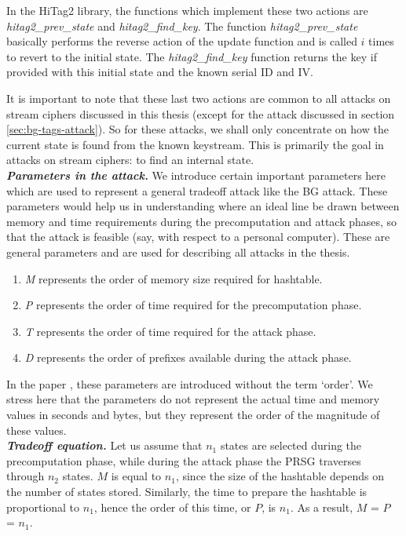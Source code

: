 In the HiTag2 library, the functions which implement these two actions are \textit{hitag2\_prev\_state} and \textit{hitag2\_find\_key}. The function \textit{hitag2\_prev\_state} basically performs the reverse action of the update function and is called $i$ times to revert to the initial state. The \textit{hitag2\_find\_key} function returns the key if provided with this initial state and the known serial ID and IV.

It is important to note that these last two actions are common to all attacks on stream ciphers discussed in this thesis (except for the attack discussed in section \ref{sec:bg-tags-attack}). So for these attacks, we shall only concentrate on how the current state is found from the known keystream. This is primarily the goal in attacks on stream ciphers: to find an internal state.\\

\noindent \textit{\textbf{Parameters in the attack.}} We introduce certain important parameters here \cite{biryukov2000ctm} which are used to represent a general tradeoff attack like the BG attack. These parameters would help us in understanding where an ideal line be drawn between memory and time requirements during the precomputation and attack phases, so that the attack is feasible (say, with respect to a personal computer). These are general parameters and are used for describing all attacks in the thesis. 

\begin{enumerate}
\item \emph{M} represents the order of memory size required for hashtable.
\item \emph{P} represents the order of time required for the precomputation phase.
\item \emph{T} represents the order of time required for the attack phase.
\item \emph{D} represents the order of prefixes available during the attack phase.
\end{enumerate}

In the paper \cite{biryukov2000ctm}, these parameters are introduced without the term \mbox{`order'}. We stress here that the parameters do not represent the actual time and memory values in seconds and bytes, but they represent the order of the magnitude of these values.\\

\noindent \textit{\textbf{Tradeoff equation.}} Let us assume that $n_1$ states are selected during the precomputation phase, while during the attack phase the PRSG traverses through $n_2$ states. $M$ is equal to $n_1$, since the size of the hashtable depends on the number of states stored. Similarly, the time to prepare the hashtable is proportional to $n_1$, hence the order of this time, or $P$, is $n_1$. As a result, $M$ = $P$ = $n_1$.

